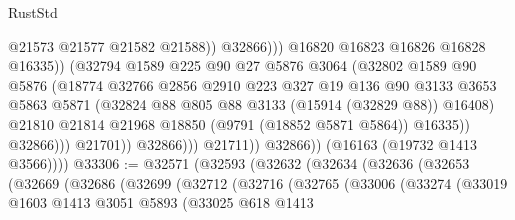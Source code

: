 \begin{lexlean}{RustStd}
\begin{coremodule}
                                            @21573
                                            @21577
                                            @21582
                                            @21588))
                                        @32866)))
                                  @16820
                                  @16823
                                  @16826
                                  @16828
                                  @16335))
                              (@32794
                                @1589
                                @225
                                @90
                                @27
                                @5876
                                @3064
                                (@32802
                                  @1589
                                  @90
                                  @5876
                                  (@18774
                                    @32766
                                    @2856
                                    @2910
                                    @223
                                    @327
                                    @19
                                    @136
                                    @90
                                    @3133
                                    @3653
                                    @5863
                                    @5871
                                    (@32824 @88 @805 @88 @3133 (@15914 (@32829 @88)) @16408)
                                    @21810
                                    @21814
                                    @21968
                                    @18850
                                    (@9791 (@18852 @5871 @5864))
                                    @16335))
                                @32866)))
                          @21701))
                      @32866)))
                @21711))
            @32866))
        (@16163 (@19732 @1413 @3566))))
@33306 := @32571
    (@32593
      (@32632
        (@32634
          (@32636
            (@32653
              (@32669
                (@32686
                  (@32699
                    (@32712
                      (@32716
                        (@32765
                          (@33006
                            (@33274
                              (@33019
                                @1603
                                @1413
                                @3051
                                @5893
                                (@33025
                                  @618
                                  @1413

\end{coremodule}
\end{lexlean}
